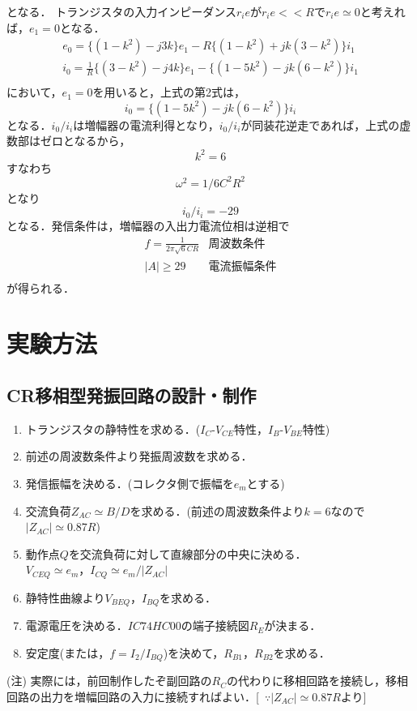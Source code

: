 \documentclass[10pt, a4j, dvipdfmx]{jarticle}
\begin{document}
    となる．
    トランジスタの入力インピーダンス$r_ie$が$r_ie<<R$で$r_ie\simeq0$と考えれば，$e_1=0$となる．
    \begin{eqnarray*}
        e_0 = \{(1-k^2) - j3k\}e_1 - R\{(1-k^2) + jk(3-k^2)\}i_1 \\
        i_0 = \frac{1}{R}\{(3-k^2) - j4k\}e_1 - \{(1-5k^2) - jk(6-k^2)\}i_1\\
    \end{eqnarray*}
    において，$e_1=0$を用いると，上式の第2式は，
    \begin{equation*}
        i_0 = \{(1-5k^2) - jk(6-k^2)\}i_i
    \end{equation*}
    となる．$i_0/i_i$は増幅器の電流利得となり，$i_0/i_i$が同装花逆走であれば，上式の虚数部はゼロとなるから，
    \begin{equation*}
        k^2 = 6
    \end{equation*}
    すなわち
    \begin{equation*}
        \omega^2 = 1/6C^2R^2
    \end{equation*}
    となり
    \begin{equation*}
        i_0/i_i = -29
    \end{equation*}
    となる．発信条件は，増幅器の入出力電流位相は逆相で
    \begin{eqnarray*}
        f = \frac{1}{2\pi\sqrt{6}CR} & 周波数条件 \\
        |A| \geq 29 & 電流振幅条件 \\
    \end{eqnarray*}
    が得られる．

    \section{実験方法}
    \subsection*{CR移相型発振回路の設計・制作}
    \begin{enumerate}
        \item トランジスタの静特性を求める．($I_C$-$V_{CE}$特性，$I_B$-$V_{BE}$特性)
        \item 前述の周波数条件より発振周波数を求める．
        \item 発信振幅を決める．(コレクタ側で振幅を$e_m$とする)
        \item 交流負荷$Z_{AC} \simeq B/D$を求める．(前述の周波数条件より$k = 6$なので$|Z_{AC}| \simeq 0.87R$)
        \item 動作点$Q$を交流負荷に対して直線部分の中央に決める．\\
              $V_{CEQ} \simeq e_m$，$I_{CQ} \simeq e_m/|Z_{AC}|$
        \item 静特性曲線より$V_{BEQ}$，$I_{BQ}$を求める．
        \item 電源電圧を決める．$IC 74HC00の端子接続図R_E$が決まる．
        \item 安定度(または，$f = I_2/I_{BQ}$)を決めて，$R_{B1}$，$R_{B2}$を求める．
    \end{enumerate}
    (注) 実際には，前回制作したぞ副回路の$R_C$の代わりに移相回路を接続し，移相回路の出力を増幅回路の入力に接続すればよい．[~$\because |Z_{AC}| \simeq 0.87R$より]
    
\end{document}
